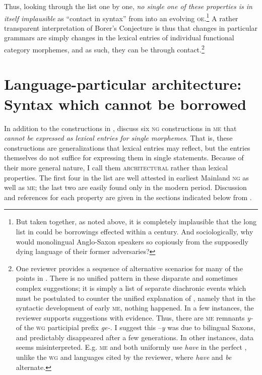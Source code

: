 \documentclass[output=paper]{LSP/langsci}
\begin{document}
Thus, looking through the list  one by one, \textit{no single one of these properties is in itself implausible} as “contact  in syntax” from  into an evolving \textsc{oe}.\footnote{But taken together, as noted above, it is completely implausible that the long list in  could be borrowings effected within a century. And sociologically, why would monolingual Anglo-Saxon speakers  so copiously from the supposedly dying language of their former adversaries?}  A rather transparent interpretation of Borer’s Conjecture is thus that changes in particular grammars are simply changes in the lexical entries of individual functional category morphemes, and as such, they can be  through contact.\footnote{One reviewer provides a sequence of alternative scenarios for many of the points in . There is no unified pattern in these disparate and sometimes complex suggestions; it is simply a list of separate diachronic events which must be postulated to counter the unified explanation of , namely that in the syntactic development of early \textsc{me}, nothing happened. In a few instances, the reviewer supports suggestions with evidence. Thus, there are \textsc{me} remnants \textit{y-} of the \textsc{wg} participial prefix \textit{ge-.} I suggest this –\textit{y} was due to bilingual Saxons, and predictably disappeared after a few generations. In other instances, data seems misinterpreted. E.g. \textsc{me} and  both uniformly use \textit{have} in the perfect , unlike the \textsc{wg} and  languages cited by the reviewer, where \textit{have} and\textit{ be} alternate.}


\section{Language-particular architecture: Syntax which cannot be borrowed}\label{sec:emonds:5}

In addition to the constructions in ,  \citet{EmondsFaarlund2014} discuss six \textsc{ng} constructions in \textsc{me} that \textit{cannot be expressed as lexical entries for single morphemes}. That is, these constructions are generalizations that lexical entries may reflect, but the entries themselves do not suffice for expressing them in single statements. Because of their more general nature, I call them \textsc{architectural} rather than lexical properties. The first four in the list  are well attested in earliest Mainland \textsc{ng} as well as \textsc{me}; the last two are easily found only in the modern period. Discussion and references for each property are given in the sections indicated below from \citet{EmondsFaarlund2014}.\largerpage[2]
\end{document}
